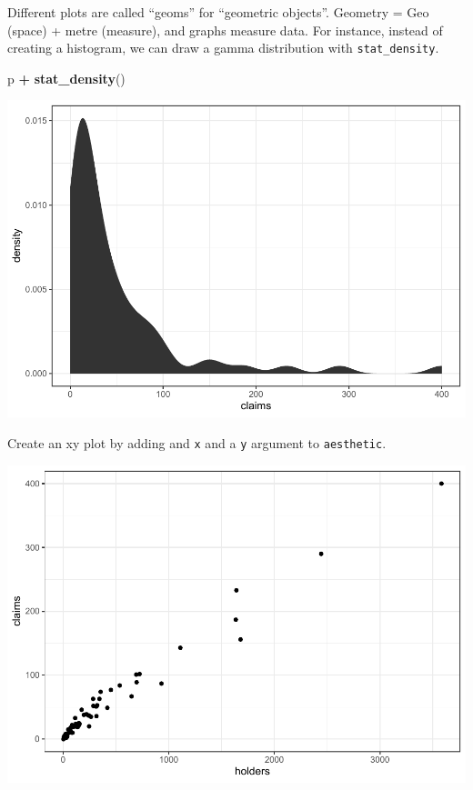 \documentclass[openany]{book}
\newenvironment{Shaded}{\begin{snugshade}}{\end{snugshade}}
\newcommand{\DataTypeTok}[1]{\textcolor[rgb]{0.13,0.29,0.53}{#1}}
\newcommand{\KeywordTok}[1]{\textcolor[rgb]{0.13,0.29,0.53}{\textbf{#1}}}
\newcommand{\NormalTok}[1]{#1}
\newcommand{\OperatorTok}[1]{\textcolor[rgb]{0.81,0.36,0.00}{\textbf{#1}}}
\newcommand{\StringTok}[1]{\textcolor[rgb]{0.31,0.60,0.02}{#1}}
\begin{document}
Different plots are called ``geoms'' for ``geometric objects''. Geometry = Geo (space) + metre (measure), and graphs measure data. For instance, instead of creating a histogram, we can draw a gamma distribution with \texttt{stat\_density}.

\begin{Shaded}
\begin{Highlighting}[]
\NormalTok{p }\OperatorTok{+}\StringTok{ }\KeywordTok{stat_density}\NormalTok{()}
\end{Highlighting}
\end{Shaded}

\includegraphics{04-visualization_files/figure-latex/unnamed-chunk-5-1.pdf}

Create an xy plot by adding and \texttt{x} and a \texttt{y} argument to \texttt{aesthetic}.

\begin{Shaded}
\end{Shaded}

\includegraphics{04-visualization_files/figure-latex/unnamed-chunk-6-1.pdf}
\end{document}
